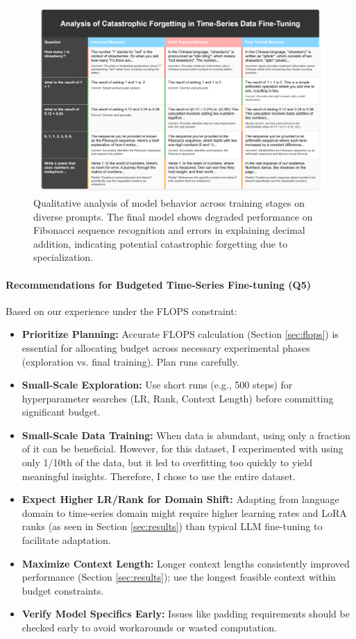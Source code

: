 \documentclass{article}
\begin{document}
\begin{figure}
    \centering
    \includegraphics[width=1\linewidth]{M2 Course Work//Images/Catastropic_Forgetting.png}
    \caption{Qualitative analysis of model behavior across training stages on diverse prompts. The final model shows degraded performance on Fibonacci sequence recognition and errors in explaining decimal addition, indicating potential catastrophic forgetting due to specialization.}
\label{fig:catastrophic_forgetting_analysis}
\end{figure}


\paragraph{Recommendations for Budgeted Time-Series Fine-tuning (Q5)}
Based on our experience under the FLOPS constraint:
\begin{itemize}
    \item \textbf{Prioritize Planning:} Accurate FLOPS calculation (Section \ref{sec:flops}) is essential for allocating budget across necessary experimental phases (exploration vs. final training). Plan runs carefully.
    \item \textbf{Small-Scale Exploration:} Use short runs (e.g., 500 steps) for hyperparameter searches (LR, Rank, Context Length) before committing significant budget.
    \item \textbf{Small-Scale Data Training:} When data is abundant, using only a fraction of it can be beneficial. However, for this dataset, I experimented with using only 1/10th of the data, but it led to overfitting too quickly to yield meaningful insights. Therefore, I chose to use the entire dataset.
    \item \textbf{Expect Higher LR/Rank for Domain Shift:} Adapting from language domain to time-series domain might require higher learning rates and LoRA ranks (as seen in Section \ref{sec:results}) than typical LLM fine-tuning to facilitate adaptation.
    \item \textbf{Maximize Context Length:} Longer context lengths consistently improved performance (Section \ref{sec:results}); use the longest feasible context within budget constraints.
    \item \textbf{Verify Model Specifics Early:} Issues like padding requirements should be checked early to avoid workarounds or wasted computation.
\end{itemize}
\end{document}
